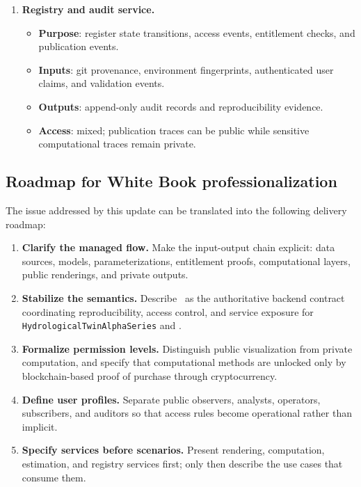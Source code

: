 \begin{enumerate}
\item \textbf{Registry and audit service.}
\begin{itemize}
    \item \textbf{Purpose}: register state transitions, access events, entitlement checks, and publication events.
    \item \textbf{Inputs}: git provenance, environment fingerprints, authenticated user claims, and validation events.
    \item \textbf{Outputs}: append-only audit records and reproducibility evidence.
    \item \textbf{Access}: mixed; publication traces can be public while sensitive computational traces remain private.
\end{itemize}
\end{enumerate}

\subsection{Roadmap for White Book professionalization}

The issue addressed by this update can be translated into the following delivery roadmap:

\begin{enumerate}
\item \textbf{Clarify the managed flow.} Make the input-output chain explicit: data sources, models, parameterizations, entitlement proofs, computational layers, public renderings, and private outputs.
\item \textbf{Stabilize the semantics.} Describe \hydrot\ as the authoritative backend contract coordinating reproducibility, access control, and service exposure for \texttt{HydrologicalTwinAlphaSeries} and \cwv.
\item \textbf{Formalize permission levels.} Distinguish public visualization from private computation, and specify that computational methods are unlocked only by blockchain-based proof of purchase through cryptocurrency.
\item \textbf{Define user profiles.} Separate public observers, analysts, operators, subscribers, and auditors so that access rules become operational rather than implicit.
\item \textbf{Specify services before scenarios.} Present rendering, computation, estimation, and registry services first; only then describe the use cases that consume them.
\end{enumerate}

